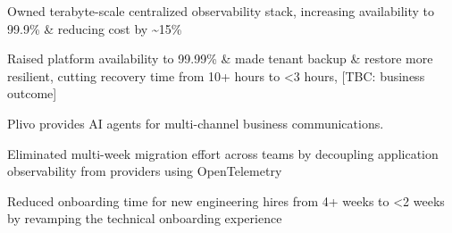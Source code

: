 \documentclass[]{AayushSarva}
\begin{document}
\begin{minipage}[t]{0.66\textwidth}
\begin{tightemize}
\item Owned terabyte-scale centralized observability stack, increasing availability to 99.9\% \& reducing cost by \textasciitilde15\%

\item Raised platform availability to 99.99\% \& made tenant backup \& restore more resilient, cutting recovery time from 10+ hours to <3 hours, [TBC: business outcome]

\end{tightemize}
\vspace{0.5em}

\hfill
{}
\vspace{0.1em}

Plivo provides AI agents for multi-channel business communications.

\vspace{0.3em}



\begin{tightemize}




\item Eliminated multi-week migration effort across teams by decoupling application observability from providers using OpenTelemetry

\item Reduced onboarding time for new engineering hires from 4+ weeks to <2 weeks by revamping the technical onboarding experience


\end{tightemize}
\end{minipage}
\end{document}
